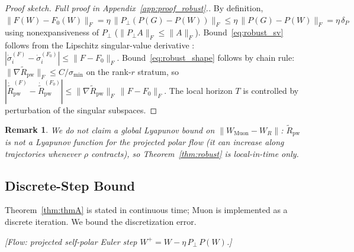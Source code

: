 \documentclass{article}
\newtheorem{remark}{Remark}
\begin{document}
\begin{proof}[Proof sketch. Full proof in Appendix~\ref{app:proof_robust}.]
By definition, $\|F(W)-F_0(W)\|_F = \eta\,\|P_\perp(P(G)-P(W))\|_F\leq \eta\,\|P(G)-P(W)\|_F = \eta\,\delta_P$ using nonexpansiveness of $P_\perp$ ($\|P_\perp A\|_F\leq\|A\|_F$). Bound~\eqref{eq:robust_sv} follows from the Lipschitz singular-value derivative \citep{stewart1990matrix}: $|\dot\sigma_i^{(F)} - \dot\sigma_i^{(F_0)}|\leq \|F-F_0\|_F$. Bound~\eqref{eq:robust_shape} follows by chain rule: $\|\nabla\widetilde R_{\mathrm{pw}}\|_F\leq C/\sigma_{\min}$ on the rank-$r$ stratum, so $|\dot{\widetilde R}_{\mathrm{pw}}^{(F)} - \dot{\widetilde R}_{\mathrm{pw}}^{(F_0)}|\leq \|\nabla\widetilde R_{\mathrm{pw}}\|_F\,\|F-F_0\|_F$. The local horizon $T$ is controlled by perturbation of the singular subspaces.
\end{proof}

\begin{remark}
We do \emph{not} claim a global Lyapunov bound on $\|W_{\mathrm{Muon}}-W_R\|$: $\widetilde R_{\mathrm{pw}}$ is not a Lyapunov function for the projected polar flow (it can increase along trajectories whenever $\rho$ contracts), so Theorem~\ref{thm:robust} is local-in-time only.
\end{remark}

\subsection{Discrete-Step Bound}
\label{sec:theory:discrete}

Theorem~\ref{thm:thmA} is stated in continuous time; Muon is implemented as a discrete iteration. We bound the discretization error.

\noindent\textit{[Flow: projected self-polar Euler step $W^+ = W - \eta\,P_\perp\,P(W)$.]}
\end{document}

